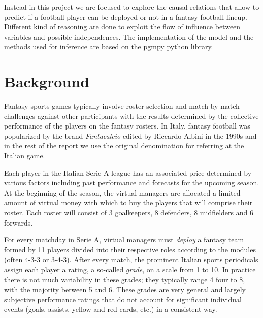 \documentclass[a4paper,10pt]{report}
\begin{document}
Instead in this project we are focused to explore the causal relations that allow to predict if a football player can be deployed or not in a fantasy football lineup. Different kind of reasoning are done to exploit the flow of influence between variables and possible independences. The implementation of the model and the methods used for inference are based on the pgmpy \cite{pgmpy} python library. 





{\let\clearpage\relax\par \chapter{Background}\label{chap:background}} 


Fantasy sports games typically involve roster selection and match-by-match challenges against other participants with the results determined by the collective performance of the players on the fantasy rosters. In Italy, fantasy football was popularized by the brand \emph{Fantacalcio} \cite{fantacalcio} edited by Riccardo Albini in the 1990s and in the rest of the report we use the original denomination for referring at the Italian game.

Each player in the Italian Serie A league has an associated price determined by various factors including past performance and forecasts for the upcoming season.
At the beginning of the season, the virtual managers are allocated a limited amount of virtual money with which to buy the players that will comprise their roster. 
Each roster will consist of 3 goalkeepers, 8 defenders, 8 midfielders and 6 forwards.

For every matchday in Serie A, virtual managers must \textit{deploy} a fantasy team formed by 11 players divided into their respective roles according to the modules (often  4-3-3 or 3-4-3).
After every match, the prominent Italian sports periodicals assign each player a rating,
a so-called \textit{grade}, on a scale from 1 to 10. In practice there is not much variability in these grades; they typically range 4 four to 8, with the majority between 5 and 6. These grades are very general and largely subjective performance ratings that do not account for significant individual events (goals, assists, yellow and red cards, etc.) in a consistent way.
\end{document}
